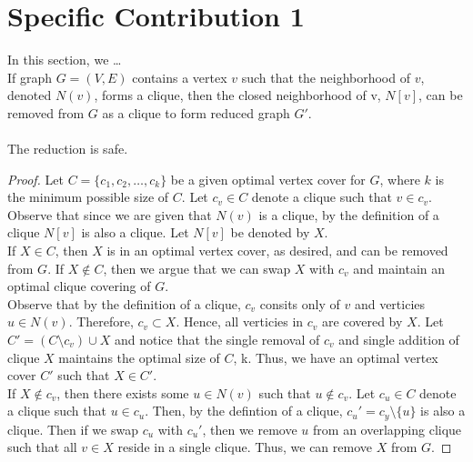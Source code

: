 \documentclass[../techreport.tex]{subfiles}
\begin{document}
\section{Specific Contribution 1}
\label{sec:specific1}
In this section, we \ldots \\
 If graph $G = (V, E)$ contains a vertex $v$ such that the neighborhood of $v$, denoted $N(v)$, forms a clique, then the closed neighborhood of v, $N[v]$, can be removed from $G$ as a clique to form reduced graph $G'$. \\ \\
 The reduction is safe.
\begin{proof}
	Let $C = \{c_1, c_2, \dots, c_k\}$ be a given optimal vertex cover for $G$, where $k$ is the minimum possible size of $C$. Let $c_v \in C$ denote a clique such that $v \in c_v$. Observe that since we are given that $N(v)$ is a clique, by the definition of a clique $N[v]$ is also a clique. Let $N[v]$ be denoted by $X$. \\
	If $X \in C$, then $X$ is in an optimal vertex cover, as desired, and can be removed from $G$. If $X \notin C$, then we argue that we can swap $X$ with $c_v$ and maintain an optimal clique covering of $G$. \\
	Observe that by the definition of a clique, $c_v$ consits only of $v$ and verticies $u \in N(v)$. Therefore, $c_v \subset X$. Hence, all verticies in $c_v$ are covered by $X$. Let $C' = (C \setminus c_v) \cup X$ and notice that the single removal of $c_v$ and single addition of clique $X$ maintains the optimal size of $C$, k. Thus, we have an optimal vertex cover $C'$ such that $X \in C'$. \\
	If $X \notin c_v$, then there exists some $u \in N(v)$ such that $u \notin c_v$. Let $c_u \in C$ denote a clique such that $u \in c_u$. Then, by the defintion of a clique, $c_u' = c_y \setminus \{u\}$ is also a clique. Then if we swap $c_u$ with $c_u'$, then we remove $u$ from an overlapping clique such that all $v \in X$ reside in a single clique. Thus, we can remove $X$ from $G$.
\end{proof}
\end{document}
